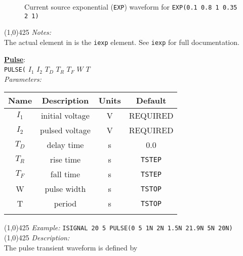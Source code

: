 \vspace*{-0.2in}
\begin{figure}[h]
\centering

\caption[Current source exponential ({\tt EXP}) waveform] {Current
source exponential ({\tt EXP}) waveform for {\tt EXP(0.1 0.8 1
0.35 2 1)} \label{fig:iexp} }
\end{figure}
\newline
\linethickness{0.5mm} \line(1,0){425}
\newline
\textit{Notes:}\\
The actual element in \FDA is the \texttt{iexp} element.
See \texttt{iexp} for full documentation.\\
\newline

\underline{\bf{Pulse}}:\\
{\tt PULSE(} $I_1$ $I_2$ \B $T_D$ \E \B $T_R$ \E \B $T_F$\E
\B $W$ \E \B $T$ \E {\tt )}\\
\textit{Parameters:}
\begin{table}[h]
\begin{tabular}{|c|c|c|c|}
\hline
Name&Description&Units&Default\\
\hline
$I_1$ & initial voltage & V & \scriptsize{REQUIRED}\\
\hline
$I_2$ & pulsed voltage & V & \scriptsize{REQUIRED}\\
\hline
$T_D$ & delay time & s & 0.0\\
\hline
$T_R$ & rise time & s & \texttt{TSTEP}\\
\hline
$T_F$ & fall time & s & \texttt{TSTEP}\\
\hline
W & pulse width & s & \texttt{TSTOP}\\
\hline
T & period & s & \texttt{TSTOP}\\
\par
\hline
\end{tabular}
\end{table}
\newline
\linethickness{0.5mm} \line(1,0){425}
\newline
\textit{Example:}
\newline
\texttt{ISIGNAL 20 5 PULSE(0 5 1N 2N 1.5N 21.9N 5N 20N)}
\newline
\linethickness{0.5mm} \line(1,0){425}
\newline
\textit{Description:}\\
The pulse transient waveform is defined by
